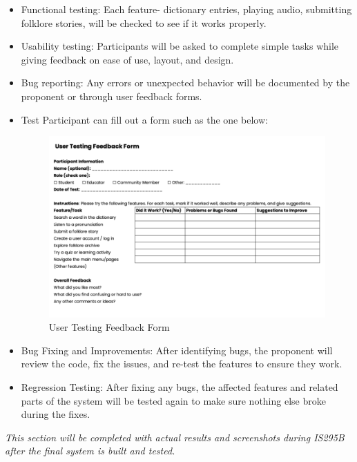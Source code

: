     \begin{itemize}
        \item Functional testing: Each feature- dictionary entries, playing audio, submitting folklore stories, will be checked to see if it works properly.
        \item Usability testing: Participants will be asked to complete simple tasks while giving feedback on ease of use, layout, and design.
        \item Bug reporting: Any errors or unexpected behavior will be documented by the proponent or through user feedback forms.
        \item Test Participant can fill out a form such as the one below:
            \begin{figure}[h]
                \centering
                \includegraphics[width=480px]{Texfiles//images/feedbackform.png}
                \caption{User Testing Feedback Form}
            \end{figure}
        \item Bug Fixing and Improvements: After identifying bugs, the proponent will review the code, fix the issues, and re-test the features to ensure they work. 
        \item Regression Testing: After fixing any bugs, the affected features and related parts of the system will be tested again to make sure nothing else broke during the fixes.
    \end{itemize}
\textit{    This section will be completed with actual results and screenshots during IS295B after the final system is built and tested.}



